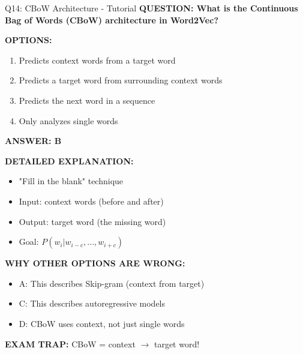 \documentclass[8pt]{beamer}
\begin{document}
	\begin{frame}{Q14: CBoW Architecture - Tutorial}
		\fontsize{6.5}{7.5}\selectfont
		\textbf{QUESTION: What is the Continuous Bag of Words (CBoW) architecture in Word2Vec?}
		
		\vspace{0.1cm}
		\textbf{OPTIONS:}
		\begin{enumerate}
			\item Predicts context words from a target word
			\item Predicts a target word from surrounding context words
			\item Predicts the next word in a sequence
			\item Only analyzes single words
		\end{enumerate}
		
		\vspace{0.1cm}
		\textcolor{myblue}{\textbf{ANSWER: B}}
		
		\vspace{0.1cm}
		\textbf{DETAILED EXPLANATION:}
		\begin{itemize}
			\item "Fill in the blank" technique
			\item Input: context words (before and after)
			\item Output: target word (the missing word)
			\item Goal: $P(w_i | w_{i-c}, ..., w_{i+c})$
		\end{itemize}
		
		\vspace{0.1cm}
		\textcolor{myred}{\textbf{WHY OTHER OPTIONS ARE WRONG:}}
		\begin{itemize}
			\item \textcolor{myred}{A:} This describes Skip-gram (context from target)
			\item \textcolor{myred}{C:} This describes autoregressive models
			\item \textcolor{myred}{D:} CBoW uses context, not just single words
		\end{itemize}
		
		\textcolor{myred}{\textbf{EXAM TRAP:}} CBoW = \textcolor{myblue}{context $\to$ target} word!
	\end{frame}
	
\end{document}
